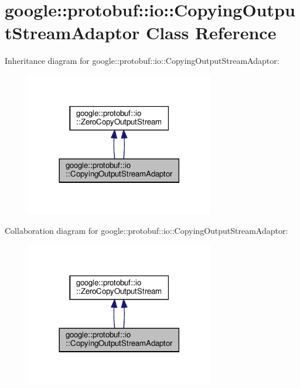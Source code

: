 \hypertarget{classgoogle_1_1protobuf_1_1io_1_1CopyingOutputStreamAdaptor}{}\section{google\+:\+:protobuf\+:\+:io\+:\+:Copying\+Output\+Stream\+Adaptor Class Reference}
\label{classgoogle_1_1protobuf_1_1io_1_1CopyingOutputStreamAdaptor}


Inheritance diagram for google\+:\+:protobuf\+:\+:io\+:\+:Copying\+Output\+Stream\+Adaptor\+:
\nopagebreak
\begin{figure}[H]
\begin{center}
\leavevmode
\includegraphics[width=233pt]{classgoogle_1_1protobuf_1_1io_1_1CopyingOutputStreamAdaptor__inherit__graph}
\end{center}
\end{figure}


Collaboration diagram for google\+:\+:protobuf\+:\+:io\+:\+:Copying\+Output\+Stream\+Adaptor\+:
\nopagebreak
\begin{figure}[H]
\begin{center}
\leavevmode
\includegraphics[width=233pt]{classgoogle_1_1protobuf_1_1io_1_1CopyingOutputStreamAdaptor__coll__graph}
\end{center}
\end{figure}
